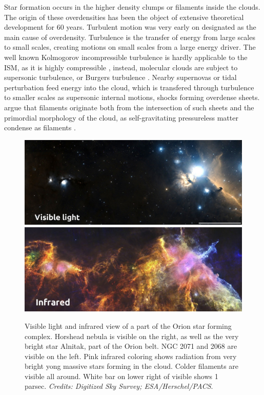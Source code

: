 Star formation occurs in the higher density clumps or filaments inside the clouds. The origin of these overdensities has been the object of extensive theoretical development for 60 years. Turbulent motion was very early on designated as the main cause of overdensity. Turbulence is the transfer of energy from large scales to small scales, creating motions on small scales from a large energy driver. The well known Kolmogorov incompressible turbulence is hardly applicable to the ISM, as it is highly compressible \citep{Scalo1998}, instead, molecular clouds are subject to supersonic turbulence, or Burgers turbulence \citep{Frisch2001}. Nearby supernovas or tidal perturbation feed energy into the cloud, which is transfered through turbulence to smaller scales as supersonic internal motions, shocks forming overdense sheets. \cite{McKee2007} argue that filaments originate both from the intersection of such sheets and the primordial morphology of the cloud, as self-gravitating pressureless matter condense as filaments \citep{Springel2005}.

\begin{figure}
\center
\includegraphics[width=0.95\linewidth]{Figures/0_horsehead_visible2}
\includegraphics[width=0.95\linewidth]{Figures/0_horsehead_infrared}
\caption{Visible light  and infrared view of a part of the Orion star forming complex. Horshead nebula is visible on the right, as well as the very bright star Alnitak, part of the Orion belt. NGC 2071 and 2068 are visible on the left. Pink infrared coloring shows radiation from very bright yong massive stars forming in the cloud. Colder filaments are visible all around. White bar on lower right of visible shows 1 parsec. \textit{Credits: Digitized Sky Survey; ESA/Herschel/PACS}. }
\label{Fig:0_horsehead}
\end{figure}

